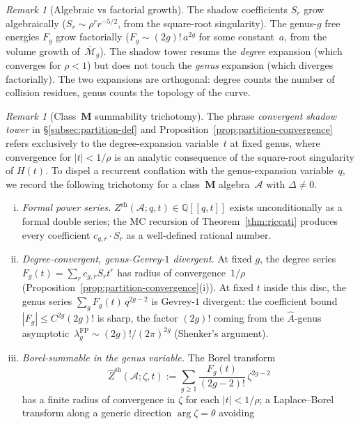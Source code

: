 \documentclass[11pt,reqno]{amsart}
\theoremstyle{definition}
\theoremstyle{remark}
\newtheorem{remark}[theorem]{Remark}
\newcommand{\cA}{\mathcal{A}}
\newcommand{\Mbar}{\overline{\mathcal{M}}}
\numberwithin{equation}{section}
\begin{document}
\begin{remark}[Algebraic vs factorial
growth]\label{rem:alg-vs-factorial}
The shadow coefficients $S_r$ grow algebraically
($S_r \sim \rho^r r^{-5/2}$, from the square-root
singularity). The genus-$g$ free energies $F_g$ grow
factorially ($F_g \sim (2g)!\, a^{2g}$ for some
constant~$a$, from the volume growth of~$\Mbar_g$). The
shadow tower resums the \emph{degree} expansion (which
converges for $\rho < 1$) but does not touch the
\emph{genus} expansion (which diverges factorially). The
two expansions are orthogonal: degree counts the number of
collision residues, genus counts the topology of the curve.
\end{remark}

\begin{remark}[Class~$\mathbf{M}$ summability
trichotomy]\label{rem:class-M-summability-trichotomy}
The phrase \emph{convergent shadow tower} in
\S\ref{subsec:partition-def} and
Proposition~\ref{prop:partition-convergence} refers
exclusively to the degree-expansion variable~$t$ at fixed
genus, where convergence for $|t|<1/\rho$ is an analytic
consequence of the square-root singularity of $H(t)$. To
dispel a recurrent conflation with the genus-expansion
variable~$q$, we record the following trichotomy for a
class~$\mathbf{M}$ algebra~$\cA$ with $\Delta\ne 0$.
\begin{enumerate}[(i)]
\item \emph{Formal power series.}\enspace
 $Z^{\mathrm{sh}}(\cA;q,t)\in\mathbb{Q}[[q,t]]$ exists
 unconditionally as a formal double series; the MC
 recursion of Theorem~\ref{thm:riccati} produces every
 coefficient $c_{g,r}\cdot S_r$ as a well-defined rational
 number.
\item \emph{Degree-convergent, genus-Gevrey-$1$ divergent.}
 At fixed $g$, the degree series $F_g(t)=\sum_r
 c_{g,r}S_r t^r$ has radius of convergence~$1/\rho$
 (Proposition~\ref{prop:partition-convergence}(i)). At
 fixed $t$ inside this disc, the genus series
 $\sum_g F_g(t)\,q^{2g-2}$ is Gevrey-$1$ divergent: the
 coefficient bound $|F_g|\le C^{2g}(2g)!$ is sharp, the
 factor $(2g)!$ coming from the $\hat A$-genus
 asymptotic~$\lambda_g^{\mathrm{FP}}\sim
 (2g)!/(2\pi)^{2g}$ (Shenker's argument).
\item \emph{Borel-summable in the genus variable.}\enspace
 The Borel transform
 \[
 \widehat Z^{\mathrm{sh}}(\cA;\zeta,t)
 :=\sum_{g\ge 1}
 \frac{F_g(t)}{(2g-2)!}\,\zeta^{2g-2}
 \]
 has a finite radius of convergence in $\zeta$ for each
 $|t|<1/\rho$; a Laplace--Borel transform along a
 generic direction $\arg\zeta=\theta$ avoiding

\end{enumerate}
\end{remark}
\end{document}
